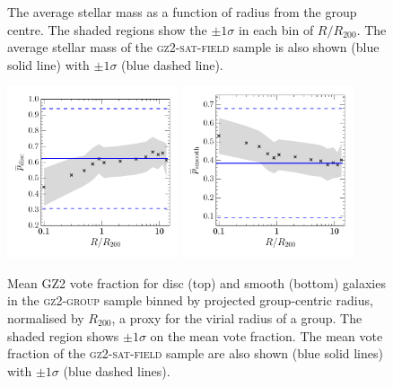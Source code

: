 \documentclass[useAMS,usenatbib]{mn2e}
\begin{document}
\begin{figure}
\caption[Average mass with group radius in the \textsc{gz2-group} sample]{The average stellar mass as a function of radius from the group centre. The shaded regions show the $\pm1\sigma$ in each bin of $R/R_{200}$. The average stellar mass of the \textsc{gz2-sat-field} sample is also shown (blue solid line) with $\pm1\sigma$ (blue dashed line).}
\label{fig:massdep}
\end{figure}

\begin{figure}
\includegraphics[width=0.45\textwidth]{p_disc_trend_with_log_radius_field_compare.pdf}
\includegraphics[width=0.45\textwidth]{p_smooth_trend_with_log_radius_field_compare.pdf}
\caption[Mean $p_d$ and $p_s$ with group radius in the \textsc{gz2-group} sample]{Mean GZ2 vote fraction for disc (top) and smooth (bottom) galaxies in the \textsc{gz2-group} sample binned by projected group-centric radius, normalised by $R_{200}$, a proxy for the virial radius of a group. The shaded region shows $\pm1\sigma$ on the mean vote fraction. The mean vote fraction of the \textsc{gz2-sat-field} sample are also shown (blue solid lines) with $\pm1\sigma$ (blue dashed lines).}
\label{fig:morphradius}
\end{figure}
\end{document}
